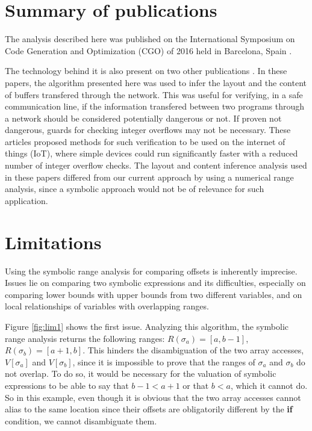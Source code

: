 \documentclass[12pt]{article}
\begin{document}
\section {Summary of publications}
The analysis described here was published on the International Symposium on 
Code Generation and Optimization (CGO) of 2016 held in Barcelona, Spain 
\cite{Paisante16}. 

The technology behind it is also present on two other publications 
\cite{Paisante14, Saggioro15}. In these papers, the algorithm presented here was used
to infer the layout and the content of buffers transfered through the network. 
This was useful for verifying, in a safe communication line, if the information 
transfered between two programs through a network should be considered potentially 
dangerous or not. If proven not dangerous, guards for checking integer overflows
may not be necessary. These articles proposed methods for such verification to 
be used on the internet of things (IoT), where simple devices could run 
significantly faster with a reduced number of integer overflow checks. 
The layout and content inference analysis used in these papers differed from our 
current approach by using a numerical range analysis, since a symbolic approach 
would not be of relevance for such application.

\section {Limitations}
Using the symbolic range analysis for comparing offsets is inherently 
imprecise. Issues lie on comparing two symbolic expressions and its 
difficulties, especially on comparing lower bounds with upper bounds from two
different variables, and on local relationships of variables with overlapping 
ranges.

Figure \ref{fig:lim1} shows the first issue. Analyzing this algorithm, the 
symbolic range analysis returns the following ranges: $R(\sigma_a) = [a, b-1]$,
$R(\sigma_b) = [a+1, b]$. This hinders the disambiguation of the two array 
accesses, $V[\sigma_a]$ and $V[\sigma_b]$, since it is impossible to prove that
 the ranges of $\sigma_a$ and $\sigma_b$ do not overlap. To do so, it would be 
 necessary for the valuation of symbolic expressions to be able to say that 
 $b-1 < a+1$ or that $b < a$, which it cannot do. So in this example, even 
 though it is obvious that the two array accesses cannot alias to the same 
 location since their offsets are obligatorily different by the \textbf{if} 
 condition, we cannot disambiguate them. 
 
\end{document}
